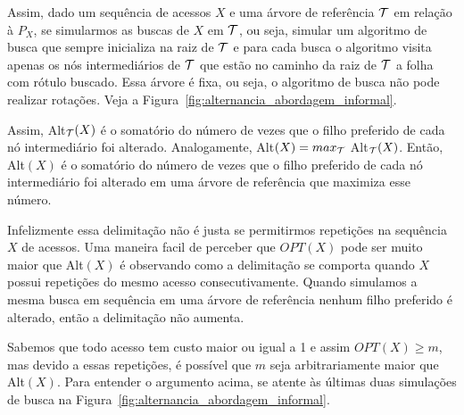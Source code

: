 Assim, dado um sequência de acessos $X$ e uma árvore de referência $\mathcal{T}$ em relação à $P_X$, se simularmos as buscas de $X$ em $\mathcal{T}$, ou seja, simular um algoritmo de busca que sempre inicializa na raiz de $\mathcal{T}$ e para cada busca o algoritmo visita apenas os nós intermediários de $\mathcal{T}$ que estão no caminho da raiz de $\mathcal{T}$ a folha com rótulo buscado. Essa árvore é fixa, ou seja, o algoritmo de busca não pode realizar rotações. Veja a Figura~\ref{fig:alternancia_abordagem_informal}.

Assim, Alt$_{\mathcal{T}}(X)$ é o somatório do número de vezes que o filho preferido de cada nó intermediário foi alterado. Analogamente, Alt$(X) = max_{\mathcal{T}}$ Alt$_{\mathcal{T}}(X)$. Então, Alt$(X)$ é o somatório do número de vezes que o filho preferido de cada nó intermediário foi alterado em uma árvore de referência que maximiza esse número.

Infelizmente essa delimitação não é justa se permitirmos repetições na sequência $X$ de acessos. Uma maneira facil de perceber que $OPT(X)$ pode ser muito maior que Alt$(X)$ é observando como a delimitação se comporta quando $X$ possui repetições do mesmo acesso consecutivamente. Quando simulamos a mesma busca em sequência em uma árvore de referência nenhum filho preferido é alterado, então a delimitação não aumenta.

Sabemos que todo acesso tem custo maior ou igual a 1 e assim $OPT(X) \geq m$, mas devido a essas repetições, é possível que $m$ seja arbitrariamente maior que Alt$(X)$. Para entender o argumento acima, se atente às últimas duas simulações de busca na Figura~\ref{fig:alternancia_abordagem_informal}.

